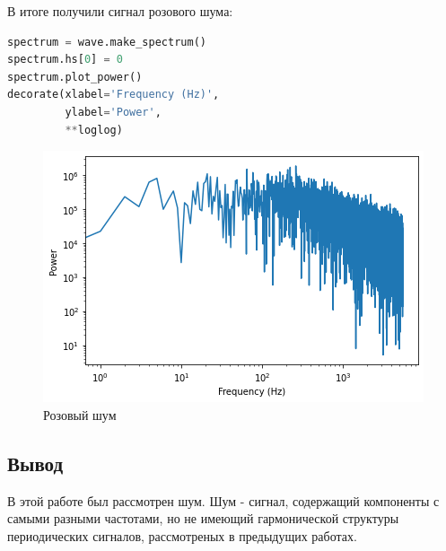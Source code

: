 В итоге получили сигнал розового шума:
\begin{lstlisting}[language=Python]
spectrum = wave.make_spectrum()
spectrum.hs[0] = 0
spectrum.plot_power()
decorate(xlabel='Frequency (Hz)',
         ylabel='Power',
         **loglog)
\end{lstlisting}
\begin{figure}[H]
	\begin{center}
		\includegraphics[scale=1]{fig/lab04/lab04_50_0.png}
		\caption{Розовый шум}
	\end{center}
\end{figure}

\subsection{Вывод}

В этой работе был рассмотрен шум. Шум - сигнал, содержащий компоненты с самыми разными частотами, но не имеющий гармонической структуры периодических сигналов, рассмотреных в предыдущих работах.